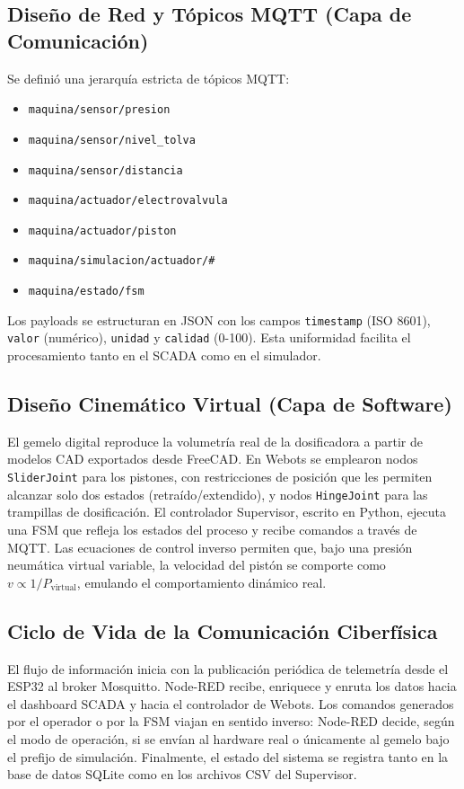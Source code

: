\subsection{Diseño de Red y Tópicos MQTT (Capa de Comunicación)}

Se definió una jerarquía estricta de tópicos MQTT:
\begin{itemize}
    \item \texttt{maquina/sensor/presion}
    \item \texttt{maquina/sensor/nivel\_tolva}
    \item \texttt{maquina/sensor/distancia}
    \item \texttt{maquina/actuador/electrovalvula}
    \item \texttt{maquina/actuador/piston}
    \item \texttt{maquina/simulacion/actuador/\#}
    \item \texttt{maquina/estado/fsm}
\end{itemize}

Los payloads se estructuran en JSON con los campos \texttt{timestamp} (ISO 8601), \texttt{valor} (numérico), \texttt{unidad} y \texttt{calidad} (0-100). Esta uniformidad facilita el procesamiento tanto en el SCADA como en el simulador.

\subsection{Diseño Cinemático Virtual (Capa de Software)}

El gemelo digital reproduce la volumetría real de la dosificadora a partir de modelos CAD exportados desde FreeCAD. En Webots se emplearon nodos \texttt{SliderJoint} para los pistones, con restricciones de posición que les permiten alcanzar solo dos estados (retraído/extendido), y nodos \texttt{HingeJoint} para las trampillas de dosificación. El controlador Supervisor, escrito en Python, ejecuta una FSM que refleja los estados del proceso y recibe comandos a través de MQTT. Las ecuaciones de control inverso permiten que, bajo una presión neumática virtual variable, la velocidad del pistón se comporte como \(v \propto 1/P_{\text{virtual}}\), emulando el comportamiento dinámico real.

\subsection{Ciclo de Vida de la Comunicación Ciberfísica}

El flujo de información inicia con la publicación periódica de telemetría desde el ESP32 al broker Mosquitto. Node-RED recibe, enriquece y enruta los datos hacia el dashboard SCADA y hacia el controlador de Webots. Los comandos generados por el operador o por la FSM viajan en sentido inverso: Node-RED decide, según el modo de operación, si se envían al hardware real o únicamente al gemelo bajo el prefijo de simulación. Finalmente, el estado del sistema se registra tanto en la base de datos SQLite como en los archivos CSV del Supervisor.

